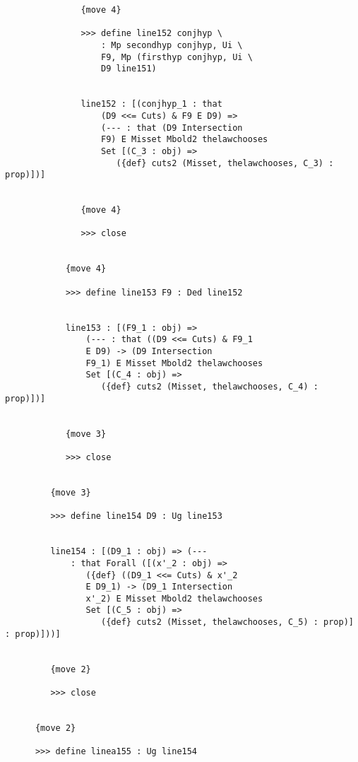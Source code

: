 \documentclass[12pt]{article}
\begin{document}
\begin{verbatim}
               {move 4}

               >>> define line152 conjhyp \
                   : Mp secondhyp conjhyp, Ui \
                   F9, Mp (firsthyp conjhyp, Ui \
                   D9 line151)


               line152 : [(conjhyp_1 : that 
                   (D9 <<= Cuts) & F9 E D9) => 
                   (--- : that (D9 Intersection 
                   F9) E Misset Mbold2 thelawchooses 
                   Set [(C_3 : obj) => 
                      ({def} cuts2 (Misset, thelawchooses, C_3) : prop)])]


               {move 4}

               >>> close


            {move 4}

            >>> define line153 F9 : Ded line152


            line153 : [(F9_1 : obj) => 
                (--- : that ((D9 <<= Cuts) & F9_1 
                E D9) -> (D9 Intersection 
                F9_1) E Misset Mbold2 thelawchooses 
                Set [(C_4 : obj) => 
                   ({def} cuts2 (Misset, thelawchooses, C_4) : prop)])]


            {move 3}

            >>> close


         {move 3}

         >>> define line154 D9 : Ug line153


         line154 : [(D9_1 : obj) => (--- 
             : that Forall ([(x'_2 : obj) => 
                ({def} ((D9_1 <<= Cuts) & x'_2 
                E D9_1) -> (D9_1 Intersection 
                x'_2) E Misset Mbold2 thelawchooses 
                Set [(C_5 : obj) => 
                   ({def} cuts2 (Misset, thelawchooses, C_5) : prop)] : prop)]))]


         {move 2}

         >>> close


      {move 2}

      >>> define linea155 : Ug line154



\end{verbatim}
\end{document}
